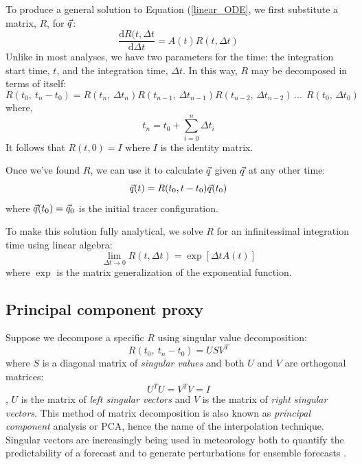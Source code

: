 \documentclass{article}
\begin{document}
To produce a general solution to Equation (\ref{linear_ODE}, 
we first substitute a matrix, $R$, for $\vec q$:
\begin{equation}
	\frac{\mathrm d R(t, \Delta t}{\mathrm d \Delta t} = A(t) R(t, \Delta t)
\end{equation}
Unlike in most analyses, we have two parameters for the time:
the integration start time, $t$, and the integration time, $\Delta t$.
In this way, $R$ may be decomposed in terms of itself:
\begin{equation}
	R(t_0,~t_n-t_0) = R(t_n, \, \Delta t_n) R(t_{n-1},\,\Delta t_{n-1}) R(t_{n-2},\,\Delta t_{n-2}) \, ...~~ 
	R(t_0,\,\Delta t_0)
\label{matrix_soln_decomposition}
\end{equation}
where,
\begin{equation}
t_n=t_0+\sum_{i=0}^{n} \Delta t_i
\end{equation}
It follows that $R(t, 0)=I$ where $I$ is the identity matrix.

Once we've found $R$, 
we can use it to calculate $\vec q$ given $\vec q$ at any other time:
\begin{equation}
	\vec q(t) = R(t_0, t-t_0) \vec q(t_0)
\end{equation}
where $\vec q(t_0)=\vec q_0$ is the initial tracer configuration.

To make this solution fully analytical, we solve $R$ for an infinitessimal
integration time using linear algebra:
\begin{equation}
	\lim_{\Delta t \rightarrow 0} R(t, \Delta t) = \exp \left [ \Delta t A(t) \right ]
\end{equation}
where $\exp$ is the matrix generalization of the exponential function.

\subsection{Principal component proxy}

Suppose we decompose a specific $R$ using singular value decomposition:
\begin{equation}
	R(t_0, ~ t_n - t_0) = U S V^T
	\label{SVD}
\end{equation}
where $S$ is a diagonal matrix of {\it singular values}
and both $U$ and $V$ are orthogonal matrices:
\begin{equation}
	U^T U = V^T V = I
\end{equation},
$U$ is the matrix of {\it left singular vectors} and 
$V$ is the matrix of {\it right singular vectors}.
This method of matrix decomposition is also known as {\it principal component}
analysis or PCA, hence the name of the interpolation technique.
Singular vectors are increasingly being used in meteorology both to quantify the
predictability of a forecast and to generate perturbations for ensemble
forecasts \citep{Tang_etal2006}.
\end{document}

